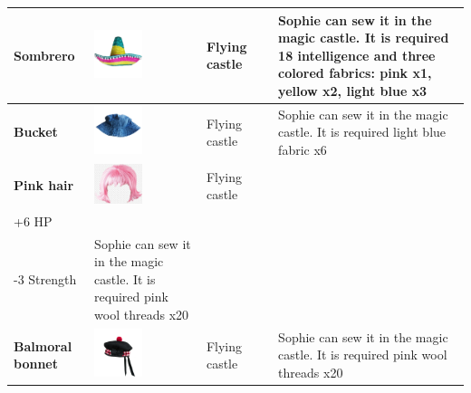 \begin{longtable}[H]{|p{2cm}|p{1.5cm}|p{2cm}|p{2.8cm}|p{6.3cm}|}
\textbf{Sombrero}                    & \includegraphics[width=1.4cm]{Images/Hats/sombrero}           & Flying castle                                                  &                                                                                       & Sophie can sew it in the magic castle. It is required 18 intelligence and three colored fabrics: pink x1, yellow x2, light blue x3     \\ \hline
\textbf{Bucket}                      & \includegraphics[width=1.4cm]{Images/Hats/bucket}             & Flying castle                                                  &                                                                                       & Sophie can sew it in the magic castle. It is required light blue fabric x6                                                             \\ \hline
\textbf{Pink hair}                   & \includegraphics[width=1.4cm]{Images/Hats/pinkHair}           & Flying castle                                                  & \begin{tabular}[c]{@{}l@{}}+6 Charsma\\ +6 HP\\ -3 Strength\end{tabular}              & Sophie can sew it in the magic castle. It is required pink wool threads x20                                                            \\ \hline
\textbf{Balmoral bonnet}             & \includegraphics[width=1.4cm]{Images/Hats/balmoralBonnet}     & Flying castle                                                  &                                                                                       & Sophie can sew it in the magic castle.  It is required pink wool threads x20                                                           \\ \hline

\end{longtable}
